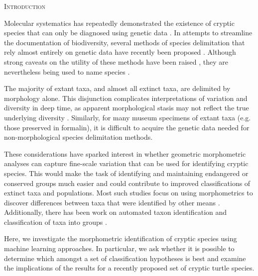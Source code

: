 \documentclass[12pt,letterpaper]{article}
\renewcommand{\section}[1]{%
\bigskip
\begin{center}
\begin{Large}
\normalfont\scshape #1
\medskip
\end{Large}
\end{center}}
\begin{document}
\section{Introduction}

Molecular systematics has repeatedly demonstrated the existence of cryptic species that can only be diagnosed using genetic data \citep{Stuart2006,Bickford2007,SchlickSteiner2007,Pfenninger2007,Clare2011,Funk2012}. In attempts to streamline the documentation of biodiversity, several methods of species delimitation that rely almost entirely on genetic data have recently been proposed \citep{Pons2006,Carstens2010,Hausdorf2010,O'Meara2010,Yang2010b,Huelsenbeck2011b}. Although strong caveats on the utility of these methods have been raised \citep{Bauer2000,Carstens2013}, they are nevertheless being used to name species \citep{Leache2010,Spinks2014}.

The majority of extant taxa, and almost all extinct taxa, are delimited by morphology alone. This disjunction complicates interpretations of variation and diversity in deep time, as apparent morphological stasis may not reflect the true underlying diversity \citep{Eldredge1972,Gould1977a,Hunt2008,VanBocxlaer2013}. Similarly, for many museum specimens of extant taxa (e.g. those preserved in formalin), it is difficult to acquire the genetic data needed for non-morphological species delimitation methods.

These considerations have sparked interest in whether geometric morphometric analyses can capture fine-scale variation that can be used for identifying cryptic species. This would make the task of identifying and maintaining endangered or conserved groups much easier and could contribute to improved classifications of extinct taxa and populations. Most such studies focus on using morphometrics to discover differences between taxa that were identified by other means \citep{Polly2003,Zelditch2004,Gaubert2005b,Gunduz2007,Polly2007a,Demandt2009}. Additionally, there has been work on automated taxon identification and classification of taxa into groups \citep{Baylac2003,Dobigny2003,MacLeod2007,VandenBrink2011}. 

Here, we investigate the morphometric identification of cryptic species using machine learning approaches. In particular, we ask whether it is possible to determine which amongst a set of classification hypotheses is best and examine the implications of the results for a recently proposed set of cryptic turtle species.
\end{document}

